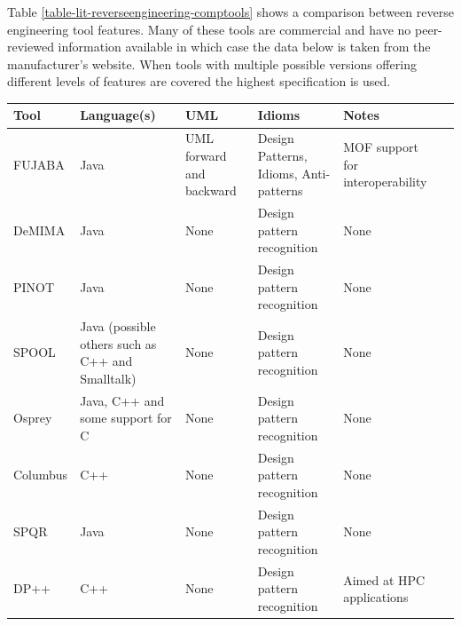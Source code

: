 Table \ref{table-lit-reverseengineering-comptools} shows a comparison between reverse engineering tool features. Many of these tools are commercial and have no peer-reviewed information available in which case the data below is taken from the manufacturer's website. When tools with multiple possible versions offering different levels of features are covered the highest specification is used.
\clearpage
\begin{longtable}{| p{3cm} | p{2cm} | p{2cm} | p{3cm} | p{3cm} | p{3cm} |}

\hline

\textbf{Tool} & \textbf{Language\newline(s)} & \textbf{UML} & \textbf{Idioms} & \textbf{Notes}\\

\hline

FUJABA \citep{fujaba} & Java & UML forward and backward & Design Patterns, Idioms, Anti-patterns & MOF support for interoperability\\

\hline

DeMIMA \citep{demima} & Java & None & Design pattern recognition & None\\

\hline

PINOT \citep{pinot} & Java & None & Design pattern recognition & None\\

\hline

SPOOL \citep{spool} & Java (possible others such as C++ and Smalltalk) & None & Design pattern recognition & None\\

\hline

Osprey \citep{shi2006reverse} & Java, C++ and some support for C & None & Design pattern recognition & None\\

\hline

Columbus \citep{columbus} & C++ & None & Design pattern recognition & None\\

\hline

SPQR \citep{arcelli2005comparison} & Java & None & Design pattern recognition & None\\

\hline

DP++ \citep{philippow2005approach} & C++ & None & Design pattern recognition & Aimed at HPC applications\\


\end{longtable}

